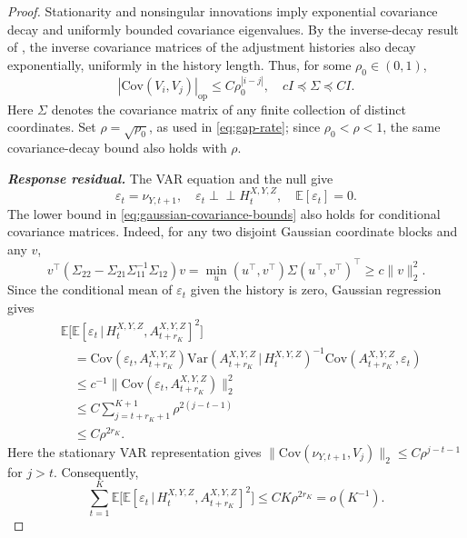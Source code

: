 \documentclass[12pt]{article}
\def\E{\mathbb{E}}
\newcommand{\indep}{\perp \!\!\! \perp}
\newcommand{\Cov}{\mathrm{Cov}}
\newcommand{\Var}{\mathrm{Var}}
\newcommand\given{\,|\,}
\numberwithin{equation}{section}
\begin{document}
\begin{proof}
Stationarity and nonsingular innovations imply exponential covariance decay and uniformly bounded covariance eigenvalues. By the inverse-decay result of \citet[Proposition~2]{jaffard1990localisees}, the inverse covariance matrices of the adjustment histories also decay exponentially, uniformly in the history length. Thus, for some \(\rho_0\in(0,1)\),
\begin{equation}\label{eq:gaussian-covariance-bounds}
|\Cov(V_i,V_j)|_{\mathrm{op}}\leq C\rho_0^{|i-j|},
\quad cI\preceq\Sigma\preceq CI.
\end{equation}
Here \(\Sigma\) denotes the covariance matrix of any finite collection of distinct coordinates. Set \(\rho=\sqrt{\rho_0}\), as used in \eqref{eq:gap-rate}; since \(\rho_0<\rho<1\), the same covariance-decay bound also holds with \(\rho\).

\smallskip\noindent\textit{\textbf{Response residual.}}
The VAR equation and the null give
\[
 \varepsilon_t=\nu_{Y,t+1},\quad
 \varepsilon_t \indep H_t^{X,Y,Z},\quad \E[\varepsilon_t]=0.
\]
The lower bound in \eqref{eq:gaussian-covariance-bounds} also holds for
conditional covariance matrices. Indeed, for any two disjoint Gaussian
coordinate blocks and any $v$,
\begin{equation}\label{eq:conditional-covariance-lower-bound}
 v^\top(\Sigma_{22}-\Sigma_{21}\Sigma_{11}^{-1}\Sigma_{12})v
 =\min_u (u^\top,v^\top)\Sigma(u^\top,v^\top)^\top
 \geq c\|v\|_2^2.
\end{equation}
Since the conditional mean of $\varepsilon_t$ given the history is zero,
Gaussian regression gives
\begin{align*}
 &\E\big[\E[\varepsilon_t\given H_t^{X,Y,Z},A_{t+r_K}^{X,Y,Z}]^2\big]\\
 &\quad=\Cov(\varepsilon_t,A_{t+r_K}^{X,Y,Z})
       \Var(A_{t+r_K}^{X,Y,Z}\given H_t^{X,Y,Z})^{-1}
       \Cov(A_{t+r_K}^{X,Y,Z},\varepsilon_t)\\
 &\quad\leq c^{-1}\|\Cov(\varepsilon_t,A_{t+r_K}^{X,Y,Z})\|_2^2 \\
 &\quad \leq C\sum_{j=t+r_K+1}^{K+1}\rho^{2(j-t-1)} \\
 & \quad \leq C\rho^{2r_K}.
\end{align*}
Here the stationary VAR representation gives
$\|\Cov(\nu_{Y,t+1},V_j)\|_2\leq C\rho^{j-t-1}$ for $j>t$.
Consequently,
\begin{equation}\label{eq:response-rate}
 \sum_{t=1}^K\E\big[
 \E[\varepsilon_t\given H_t^{X,Y,Z},A_{t+r_K}^{X,Y,Z}]^2\big]
 \leq CK\rho^{2r_K}=o(K^{-1}).
\end{equation}


\end{proof}
\end{document}
